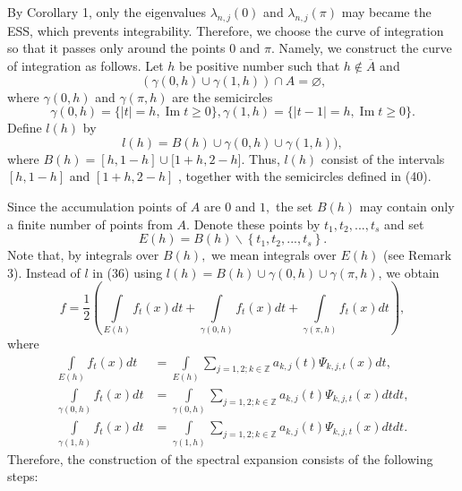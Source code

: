 \documentclass{article}%
\begin{document}
By Corollary 1, only the eigenvalues $\lambda_{n,j}(0)$ and $\lambda_{n,j}%
(\pi)$ may became the ESS, which prevents integrability. Therefore, we choose
the curve of integration so that it passes only around the points $0$ and
$\pi$. Namely, we construct the curve of integration as follows. Let $h$ be
positive number such that $h\notin\overline{A}$ and
\begin{equation}
\left(  \gamma(0,h)\cup\gamma(1,h)\right)  \cap A=\varnothing\text{,} \tag{39}%
\end{equation}
where $\gamma(0,h)$ and $\gamma(\pi,h)$ are the semicircles
\begin{equation}
\gamma(0,h)=\{\left\vert t\right\vert =h,\operatorname{Im}t\geq0\},\text{
}\gamma(1,h)=\{\left\vert t-1\right\vert =h,\operatorname{Im}t\geq0\}.
\tag{40}%
\end{equation}
Define $l(h)$ by
\begin{equation}
l(h)=B(h)\cup\gamma(0,h)\cup\gamma(1,h)), \tag{41}%
\end{equation}
where $B(h)=[h,1-h]\cup\lbrack1+h,2-h].$ Thus, $l(h)$ consist of the intervals
$[h,1-h]$ and $[1+h,2-h]$ , together with the semicircles defined in (40).

Since the accumulation points of $A$ are $0$ and $1,$ the set $B(h)$ may
contain only a finite number of points from $A.$ Denote these points by
$t_{1},t_{2},...,t_{s}$ and set
\begin{equation}
E(h)=B(h)\backslash\left\{  t_{1},t_{2},...,t_{s}\right\}  . \tag{42}%
\end{equation}
Note that, by integrals over $B(h),$ we mean integrals over $E(h)$ (see Remark
3). Instead of $l$ in (36) using $l(h)=B(h)\cup\gamma(0,h)\cup\gamma(\pi,h)$,
we obtain%
\begin{equation}
f=\frac{1}{2}\left(  \int\limits_{E(h)}f_{t}(x)dt+\int\limits_{\gamma
(0,h)}f_{t}(x)dt+\int\limits_{\gamma(\pi,h)}f_{t}(x)dt\right)  , \tag{43}%
\end{equation}
where
\begin{align}
\int\limits_{E(h)}f_{t}(x)dt  &  =\int\limits_{E(h)}\sum\limits_{j=1,2;k\in
\mathbb{Z}}a_{k,j}(t)\Psi_{k,j,t}(x)dt,\nonumber\\
\int\limits_{\gamma(0,h)}f_{t}(x)dt  &  =\int\limits_{\gamma(0,h)}%
\sum\limits_{j=1,2;k\in\mathbb{Z}}a_{k,j}(t)\Psi_{k,j,t}(x)dtdt,\tag{44}\\
\int\limits_{\gamma(1,h)}f_{t}(x)dt  &  =\int\limits_{\gamma(1,h)}%
\sum\limits_{j=1,2;k\in\mathbb{Z}}a_{k,j}(t)\Psi_{k,j,t}(x)dtdt.\nonumber
\end{align}
Therefore, the construction of the spectral expansion consists of the
following steps:
\end{document}
